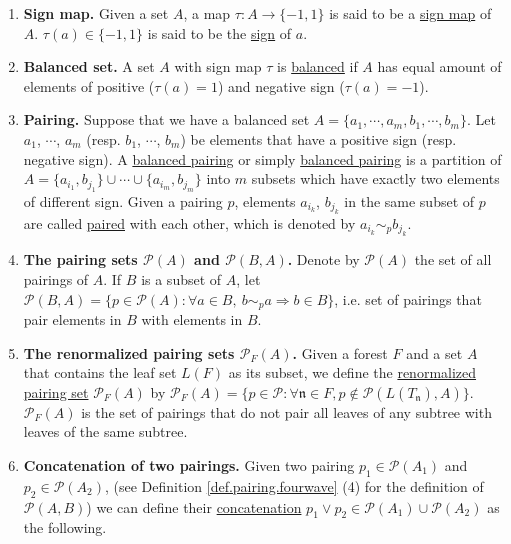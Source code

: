  \begin{defn}\label{def.pairing.fourwave}
 \begin{enumerate}
  \item \textbf{Sign map.} Given a set $A$, a map $\tau:A\rightarrow \{-1,1\}$ is said to be a \underline{sign map} of $A$. $\tau(a)\in \{-1,1\}$ is said to be the \underline{sign} of $a$. 
  \item \textbf{Balanced set.} A set $A$ with sign map $\tau$ is \underline{balanced} if $A$ has equal amount of elements of positive ($\tau(a)=1$) and negative sign ($\tau(a)=-1$).
  \item \textbf{Pairing.} Suppose that we have a balanced set $A=\{a_1,\cdots,a_{m}, b_1, \cdots,b_m\}$. Let $a_1$, $\cdots$, $a_{m}$ (resp. $b_1$, $\cdots$, $b_{m}$) be elements that have a positive sign (resp. negative sign). A \underline{balanced pairing} or simply \underline{balanced pairing} is a partition of $A=\{a_{i_1},b_{j_1}\}\cup\cdots\cup \{a_{i_{m}},b_{j_m}\}$ into $m$ subsets which have exactly two elements of different sign. Given a pairing $p$, elements $a_{i_{k}}$, $b_{j_{k}}$ in the same subset of $p$ are called \underline{paired} with each other, which is denoted by $a_{i_{k}}\sim_{p} b_{j_{k}}$.
  \item \textbf{The pairing sets $\mathcal{P}(A)$ and $\mathcal{P}(B,A)$.} Denote by $\mathcal{P}(A)$ the set of all pairings of $A$. If $B$ is a subset of $A$, let $\mathcal{P}(B,A)=\{p\in \mathcal{P}(A):\forall a\in B,\ b\sim_{p}a \Rightarrow b\in B\}$, i.e. set of pairings that pair elements in $B$ with elements in $B$. 
  \item \textbf{The renormalized pairing sets $\mathcal{P}_F(A)$.} Given a forest $F$ and a set $A$ that contains the leaf set $L(F)$ as its subset, we define the \underline{renormalized pairing set} $\mathcal{P}_F(A)$ by $\mathcal{P}_F(A)=\{p\in\mathcal{P}:\forall \mathfrak{n}\in F,p\notin \mathcal{P}(L(T_{\mathfrak{n}}),A)\}$. $\mathcal{P}_F(A)$ is the set of pairings that do not pair all leaves of any subtree with leaves of the same subtree.
  \item \textbf{Concatenation of two pairings.} Given two pairing $p_1\in\mathcal{P}(A_1)$ and $p_2\in\mathcal{P}(A_2)$, (see Definition \ref{def.pairing.fourwave} (4) for the definition of $\mathcal{P}(A,B)$) we can define their \underline{concatenation} $p_1\vee p_2\in \mathcal{P}(A_1)\cup \mathcal{P}(A_2)$ as the following. 
  

\end{enumerate}
\end{defn}
